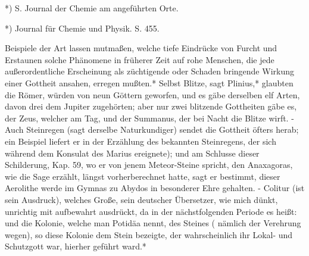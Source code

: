 \documentclass[a4paper, 11pt, oneside, polutonikogreek, german]{article}
\begin{document}
*) S. Journal der Chemie am angeführten Orte.

*) Journal für Chemie und Physik. S. 455.

Beispiele der Art lassen mutmaßen, welche tiefe Eindrücke von Furcht und Erstaunen solche Phänomene in früherer Zeit auf rohe Menschen, die jede außerordentliche Erscheinung als züchtigende oder Schaden bringende Wirkung einer Gottheit ansahen, erregen mußten.* Selbst Blitze, sagt Plinius,* glaubten die Römer, würden von neun Göttern geworfen, und es gäbe derselben elf Arten, davon drei dem Jupiter zugehörten; aber nur zwei blitzende Gottheiten gäbe es, der Zeus, welcher am Tag, und der Summanus, der bei Nacht die Blitze wirft. - Auch Steinregen (sagt derselbe Naturkundiger) sendet die Gottheit öfters herab; ein Beispiel liefert er in der Erzählung des bekannten Steinregens, der sich während dem Konsulat des Marius ereignete); und am Schlusse dieser Schilderung, Kap. 59, wo er von jenem Meteor-Steine spricht, den Anaxagoras, wie die Sage erzählt, längst vorherberechnet hatte, sagt er bestimmt, dieser Aerolithe werde im Gymnas zu Abydos in besonderer Ehre gehalten. - Colitur (ist sein Ausdruck), welches Große, sein deutscher Übersetzer, wie mich dünkt, unrichtig mit aufbewahrt ausdrückt, da in der nächstfolgenden Periode es heißt: und die Kolonie, welche man Potidäa nennt, des Steines ( nämlich der Verehrung wegen), so diese Kolonie dem Stein bezeigte, der wahrscheinlich ihr Lokal- und Schutzgott war, hierher geführt ward.*
\end{document}

